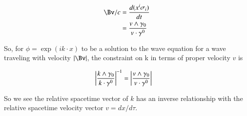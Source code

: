 \begin{align*}
\Bv/c
&= \frac{d (x^i \sigma_i) }{dt} \\
&= \frac{v \wedge \gamma_0}{ v \cdot \gamma^0 }
\end{align*}

So, for $\phi = \exp(i k \cdot x)$ to be a solution to the wave equation for a wave traveling with velocity $\Abs{\Bv}$, the constraint on k
in terms of proper velocity $v$ is

\begin{align}
\left\lvert{\frac{k \wedge \gamma_0}{ k \cdot \gamma^0 }}\right\rvert^{-1} &=
\left\lvert{\frac{v \wedge \gamma_0}{ v \cdot \gamma^0 }}\right\rvert
\end{align}

So we see the relative spacetime vector of $k$ has an inverse relationship with the relative spacetime velocity vector $v = dx/d\tau$.
